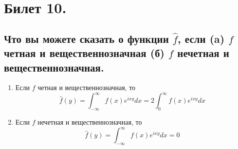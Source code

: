 \section{Билет 10.}

\subsection{Что вы можете сказать о функции $\hat{f}$, если (a) $f$ четная и вещественнозначная (б) $f$ нечетная и вещественнозначная.}
\begin{statement}
    \text{}
    \begin{enumerate}
        \item Если $f$ четная и вещественнозначная, то
        \[
            \hat{f}(y) = \int_{-\infty}^{\infty} f(x) e^{ixy} dx = 2 \int_{0}^{\infty} f(x) e^{ixy} dx
        \]
        \item Если $f$ нечетная и вещественнозначная, то
        \[
            \hat{f}(y) = \int_{-\infty}^{\infty} f(x) e^{ixy} dx = 0
        \]
    \end{enumerate}
\end{statement}